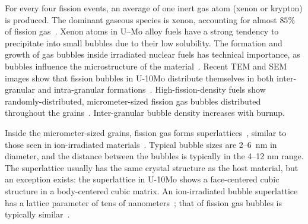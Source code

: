 For every four fission events, an average of one inert gas atom (xenon or krypton) is produced. The dominant gaseous species is xenon, accounting for almost $85\%$ of fission gas~\cite{blades1956ratio,petruska1955absolute}. Xenon atoms in U--Mo alloy fuels have a strong tendency to precipitate into small bubbles due to their low solubility. The formation and growth of gas bubbles inside irradiated nuclear fuels has technical importance, as bubbles influence the microstructure of the material~\cite{kim2011fission}. Recent TEM and SEM images show that fission bubbles in U-10Mo distribute themselves in both inter-granular and intra-granular formations~\cite{miller2015transmission,miller2012advantages, gan2012tem, gan2010transmission}. High-fission-density fuels show randomly-distributed, micrometer-sized fission gas bubbles distributed throughout the grains~\cite{gan2012tem}. Inter-granular bubble density increases with burnup. 

Inside the micrometer-sized grains, fission gas forms superlattices~\cite{gan2012tem,miller2015transmission,miller2012advantages},
similar to those seen in ion-irradiated materials~\cite{johnson1980gas, johnson1980hydrogen, evans1983void, mazey1986bubble, evans1986solid, johnson1991image, johnson1995gas, lawson1998temperature, ghoniem2001theory,johnson2006helium}. Typical bubble sizes are 2--6~nm in diameter, and the distance between the bubbles is typically in the 4--12 nm range. The superlattice usually has the same crystal structure as the host material, but an exception exists: the superlattice in U-10Mo shows a face-centered cubic structure in a body-centered cubic matrix. An ion-irradiated bubble superlattice has a lattice parameter of tens of nanometers~\cite{miller2015transmission}; that of fission gas bubbles is
typically similar~\cite{Gan2015}.


